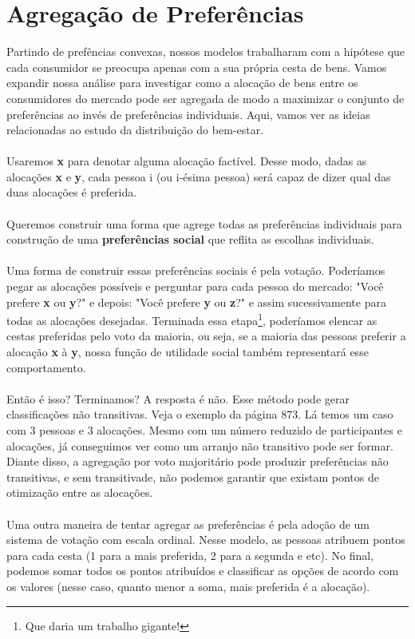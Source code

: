 \documentclass[a4paper,11pt,oneside]{book}
\theoremstyle{definition}
\theoremstyle{break}
\begin{document}
\section{Agregação de Preferências}

Partindo de prefências convexas, nossos modelos trabalharam com a hipótese que cada consumidor se preocupa apenas com a sua própria cesta de bens. Vamos expandir nossa análise para investigar como a alocação de bens entre os consumidores do mercado pode ser agregada de modo a maximizar o conjunto de preferências ao invés de preferências individuais. Aqui, vamos ver as ideias relacionadas ao estudo da distribuição do bem-estar.
\\
\\
Usaremos \textbf{x} para denotar alguma alocação factível. Desse modo, dadas as alocações \textbf{x} e \textbf{y}, cada pessoa i (ou i-ésima pessoa) será capaz de dizer qual das duas alocações é preferida.
\\
\\
Queremos construir uma forma que agrege todas as preferências individuais para construção de uma \textbf{preferências social} que reflita as escolhas individuais.
\\
\\
Uma forma de construir essas preferências sociais é pela votação. Poderíamos pegar as alocações possíveis e perguntar para cada pessoa do mercado: "Você prefere \textbf{x} ou \textbf{y}?" e depois: "Você prefere \textbf{y} ou \textbf{z}?" e assim sucessivamente para todas as alocações desejadas. Terminada essa etapa\footnote{Que daria um trabalho gigante!}, poderíamos elencar as cestas preferidas pelo voto da maioria, ou seja, se a maioria das pessoas preferir a alocação \textbf{x} à \textbf{y}, nossa função de utilidade social também representará esse comportamento.
\\
\\
Então é isso? Terminamos? A resposta é não. Esse método pode gerar classificações não transitivas. Veja o exemplo da página 873. Lá temos um caso com 3 pessoas e 3 alocações. Mesmo com um número reduzido de participantes e alocações, já conseguimos ver como um arranjo não transitivo pode ser formar. Diante disso, a agregação por voto majoritário pode produzir preferências não transitivas, e sem transitivade, não podemos garantir que existam pontos de otimização entre as alocações.
\\
\\
Uma outra maneira de tentar agregar as preferências é pela adoção de um sistema de votação com escala ordinal. Nesse modelo, as pessoas atribuem pontos para cada cesta (1 para a mais preferida, 2 para a segunda e etc). No final, podemos somar todos os pontos atribuídos e classificar as opções de acordo com os valores (nesse caso, quanto menor a soma, mais preferida é a alocação).
\end{document}
